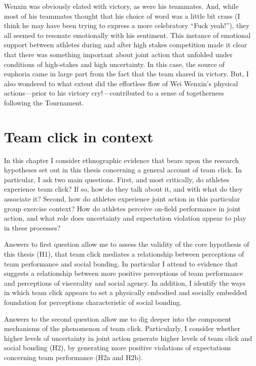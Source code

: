\begin{CJK}{UTF8}{gbsn}
Wenxin was obviously elated with victory, as were his teammates. And, while most of his teammates thought that his choice of word was a little bit crass (I think he may have been trying to express a more celebratory ``Fuck yeah!''), they all seemed to resonate emotionally with his sentiment.  This instance of emotional support between athletes during and after high stakes competition made it clear that there was something important about joint action that unfolded under conditions of high-stakes and high uncertainty. In this case, the source of euphoria came in large part from the fact that the team shared in victory.  But, I also wondered to what extent did the effortless flow of Wei Wenxin's physical actions---prior to his victory cry!---contributed to a sense of togetherness following the Tournament.








\section{Team click in context}
In this chapter I consider ethnographic evidence that bears upon the research hypotheses set out in this thesis concerning a general account of team click.  In particular, I ask two main questions.  First, and most critically, do athletes experience team click? If so, how do they talk about it, and with what do they associate it?  Second, how do athletes experience joint action in this particular group exercise context?  How do athletes perceive on-field performance in joint action, and what role does uncertainty and expectation violation appear to play in these processes?

Answers to first question allow me to assess the validity of the core hypothesis of this thesis (H1), that team click mediates a relationship between perceptions of team performance and social bonding. In particular I attend to evidence that suggests a relationship between more positive perceptions of team performance and perceptions of viscerality and social agency. In addition, I identify the ways in which team click appears to set a physically embodied and socially embedded foundation for perceptions characteristic of social bonding.

Answers to the second question allow me to dig deeper into the component mechanisms of the phenomenon of team click.  Particularly, I consider whether higher levels of uncertainty in joint action generate higher levels of team click and social bonding (H2), by generating more positive violations of expectations concerning team performance (H2a and H2b).


\end{CJK}
